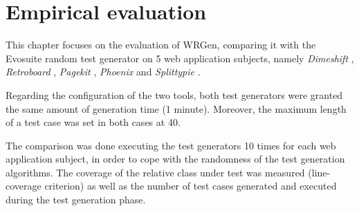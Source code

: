 \chapter{Empirical evaluation} \label{ch:EmpEvaluation}
This chapter focuses on the evaluation of WRGen, comparing it with the Evosuite random test generator on 5 web application subjects, namely \textit{Dimeshift} \cite{dimeshift}, \textit{Retroboard} \cite{retroboard}, \textit{Pagekit} \cite{pagekit}, \textit{Phoenix} \cite{phoenix} and \textit{Splittypie} \cite{splittypie}.

Regarding the configuration of the two tools, both test generators were granted the same amount of generation time (1 minute). Moreover, the maximum length of a test case was set in both cases at 40.

The comparison was done executing the test generators 10 times for each web application subject, in order to cope with the randomness of the test generation algorithms. The coverage of the relative class under test was measured (line-coverage criterion) as well as the number of test cases generated and executed during the test generation phase. 




